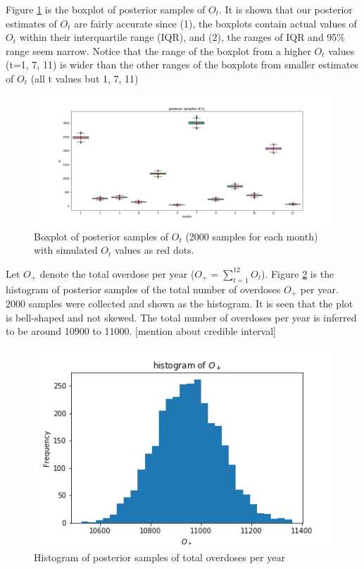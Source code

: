 \documentclass[12pt]{article}
\begin{document}
{Figure \ref{pst_ot} is the boxplot of posterior samples of $O_t$. It is shown that our posterior estimates of  $O_t$ are fairly accurate since (1), the boxplots contain actual values of $O_t$ within their interquartile range (IQR), and (2), the ranges of IQR and 95\% range seem narrow. Notice that the range of the boxplot from a higher $O_t$ values (t=1, 7, 11) is wider than the other ranges of the boxplots from smaller estimates of $O_t$ (all t values but 1, 7, 11)\\

\begin{figure}[h]
	\centering
	\includegraphics[width=1\linewidth]{Figures/earlyresult1_ot.png}
	\caption{Boxplot of posterior samples of $O_t$ (2000 samples for each month) with simulated $O_t$ values as red dots.}
	\label{pst_ot}
\end{figure}

Let $O_+$ denote the total overdose per year ($O_+ = \sum_{t=1}^{12}O_t $). Figure \ref{hst_ot} is the histogram of posterior samples of the total number of overdoses $O_+$ per year. 2000 samples were collected and shown as the histogram.  It is seen that the plot is bell-shaped and not skewed. The total number of overdoses per year is inferred to be around 10900 to 11000. [mention about credible interval] \\

\begin{figure}[h]
	\centering
	\includegraphics[width=1\linewidth]{Figures/hist_sum_ot.png}
	\caption{Histogram of posterior samples of total overdoses per year}
	\label{hst_ot}
\end{figure}

}
\end{document}
